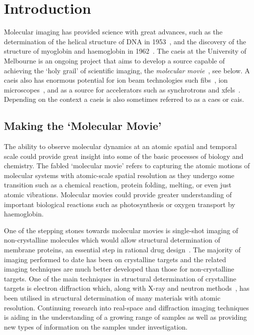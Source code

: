  \chapter{Introduction}
 
\setcounter{page}{1}

Molecular imaging has provided science with great advances, such as the determination of the helical structure of DNA in 1953~\cite{watson_molecular_1953}, and the discovery of the structure of myoglobin and haemoglobin in 1962~\cite{kendrew_x-ray_1957}.
The \gls{caeis} at the University of Melbourne is an ongoing project that aims to develop a source capable of achieving the `holy grail' of scientific imaging, the \emph{molecular movie}~\cite{dwyer_femtosecond_2006,sciaini_femtosecond_2011}, see below.
A \gls{caeis} also has enormous potential for ion beam technologies such \glspl{fib}~\cite{mcclelland_bright_2016}, ion microscopes~\cite{knuffman_cold_2013}, and as a source for accelerators such as synchrotrons and \glspl{xfel}~\cite{van_oudheusden_electron_2007,zhu_future_2015,mcculloch_cold_2016}.
Depending on the context a \gls{caeis} is also sometimes referred to as a \gls{caes} or \gls{cais}.

\section{Making the `Molecular Movie'}

The ability to observe molecular dynamics at an atomic spatial and temporal scale could provide great insight into some of the basic processes of biology and chemistry.
The fabled `molecular movie' refers to capturing the atomic motions of molecular systems with atomic-scale spatial resolution as they undergo some transition such as a chemical reaction, protein folding, melting, or even just atomic vibrations.
Molecular movies could provide greater understanding of important biological reactions such as photosynthesis or oxygen transport by haemoglobin.

One of the stepping stones towards molecular movies is single-shot imaging of non-crystalline molecules which would allow structural determination of membrane proteins, an essential step in rational drug design~\cite{hardy_atomic_1987, barrett_discovering_1999, pinto_influenza_1992}.
The majority of imaging performed to date has been on crystalline targets and the related imaging techniques are much better developed than those for non-crystalline targets.
One of the main techniques in structural determination of crystalline targets is electron diffraction which, along with X-ray and neutron methods~\cite{cullity_elements_2001,bacon_x-ray_2013}, has been utilised in structural determination of many materials with atomic resolution.
Continuing research into real-space and diffraction imaging techniques is aiding in the understanding of a growing range of samples as well as providing new types of information on the samples under investigation.

